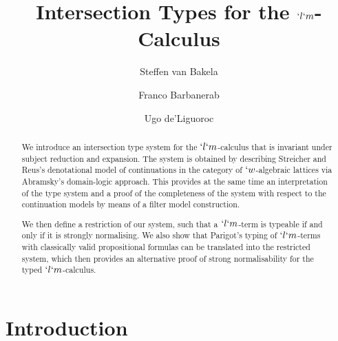 \documentclass{CSML}
\begin{document}
 \title[Intersection Types for $`l`m $] {Intersection Types for the $`l`m$-Calculus}

 \author[S. van Bakel]{Steffen van Bakel\rsuper a}
 \address{{\lsuper a}Department of Computing, Imperial College London, 180 Queen's Gate, London SW7 2BZ, UK}	%

 \author[F.~Barbanera]{Franco Barbanera\rsuper b}	
 \address{{\lsuper b}Dipartimento di Matematica e Informatica, Universit\`a degli Studi di Catania, Viale A. Doria 6, 95125 Catania, Italy}	

 \author[U.~de'Liguoro]{Ugo de'Liguoro\rsuper c}
 \address{{\lsuper c}Dipartimento di Informatica, Universit\`a degli Studi di Torino, Corso Svizzera 185, 10149 Torino, Italy}



 \begin{abstract}
We introduce an intersection type system for the $`l`m$-calculus that is invariant under subject reduction and expansion.
The system is obtained by describing Streicher and Reus's denotational model of continuations in the category of $`w$-algebraic lattices via Abramsky's domain-logic approach.
This provides at the same time an interpretation of the type system and a proof of the completeness of the system with respect to the continuation models by means of a filter model construction.

We then define a restriction of our system, such that a $`l`m$-term is typeable if and only if it is strongly normalising. 
We also show that Parigot's typing of $`l`m$-terms with classically valid propositional formulas can be translated into the restricted system, which then provides an alternative proof of strong normalisability for the typed $`l`m$-calculus.

 \end{abstract}

 \maketitle



% 

 \section*{Introduction} \label{sec:intro}
\end{document}
